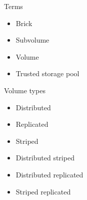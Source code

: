 \documentclass{beamer}
\begin{document}
\begin{frame}{Terms}
	\begin{itemize}
		\item Brick     %
		\item Subvolume %
		\item Volume    %



		\item Trusted storage pool
	\end{itemize}
\end{frame}

\begin{frame}{Volume types}
	\begin{itemize}
		\item Distributed
		\item Replicated
		\item Striped
		\vspace{1cm}
		\item Distributed striped
		\item Distributed replicated
		\item Striped replicated
	\end{itemize}
\end{frame}
\end{document}
